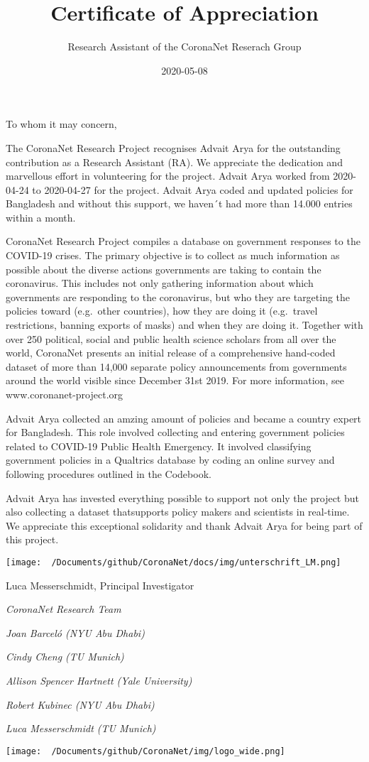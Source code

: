 \documentclass[]{article}
\title{Certificate of Appreciation}
\author{Research Assistant of the CoronaNet Reserach Group}
\date{2020-05-08}
\begin{document}
\maketitle

To whom it may concern,

The CoronaNet Research Project recognises Advait Arya for the
outstanding contribution as a Research Assistant (RA). We appreciate the
dedication and marvellous effort in volunteering for the project. Advait
Arya worked from 2020-04-24 to 2020-04-27 for the project. Advait Arya
coded and updated policies for Bangladesh and without this support, we
haven´t had more than 14.000 entries within a month.

CoronaNet Research Project compiles a database on government responses
to the COVID-19 crises. The primary objective is to collect as much
information as possible about the diverse actions governments are taking
to contain the coronavirus. This includes not only gathering information
about which governments are responding to the coronavirus, but who they
are targeting the policies toward (e.g.~other countries), how they are
doing it (e.g.~travel restrictions, banning exports of masks) and when
they are doing it. Together with over 250 political, social and public
health science scholars from all over the world, CoronaNet presents an
initial release of a comprehensive hand-coded dataset of more than
14,000 separate policy announcements from governments around the world
visible since December 31st 2019. For more information, see
www.coronanet-project.org

Advait Arya collected an amzing amount of policies and became a country
expert for Bangladesh. This role involved collecting and entering
government policies related to COVID-19 Public Health Emergency. It
involved classifying government policies in a Qualtrics database by
coding an online survey and following procedures outlined in the
Codebook.

Advait Arya has invested everything possible to support not only the
project but also collecting a dataset thatsupports policy makers and
scientists in real-time. We appreciate this exceptional solidarity and
thank Advait Arya for being part of this project.

\texttt{[image: ~/Documents/github/CoronaNet/docs/img/unterschrift\_LM.png]}

Luca Messerschmidt, Principal Investigator

\emph{CoronaNet Research Team}

\emph{Joan Barceló (NYU Abu Dhabi)}

\emph{Cindy Cheng (TU Munich)}

\emph{Allison Spencer Hartnett (Yale University)}

\emph{Robert Kubinec (NYU Abu Dhabi)}

\emph{Luca Messerschmidt (TU Munich)}

\texttt{[image: ~/Documents/github/CoronaNet/img/logo\_wide.png]}
\end{document}
